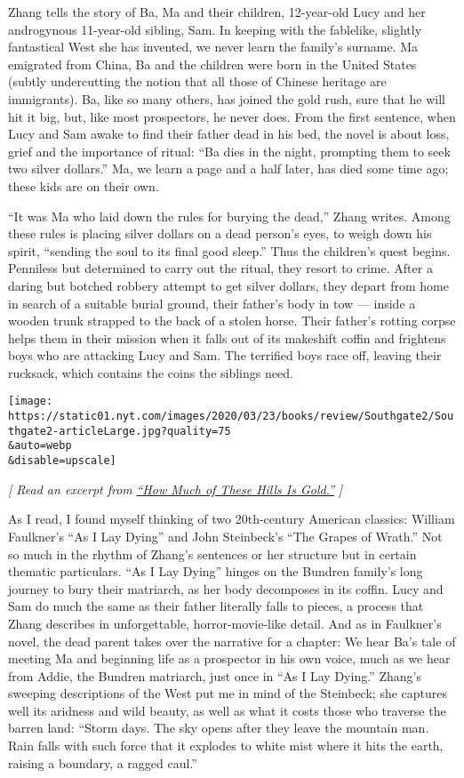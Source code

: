 Zhang tells the story of Ba, Ma and their children, 12-year-old Lucy and
her androgynous 11-year-old sibling, Sam. In keeping with the fablelike,
slightly fantastical West she has invented, we never learn the family's
surname. Ma emigrated from China, Ba and the children were born in the
United States (subtly undercutting the notion that all those of Chinese
heritage are immigrants). Ba, like so many others, has joined the gold
rush, sure that he will hit it big, but, like most prospectors, he never
does. From the first sentence, when Lucy and Sam awake to find their
father dead in his bed, the novel is about loss, grief and the
importance of ritual: ``Ba dies in the night, prompting them to seek two
silver dollars.'' Ma, we learn a page and a half later, has died some
time ago; these kids are on their own.

``It was Ma who laid down the rules for burying the dead,'' Zhang
writes. Among these rules is placing silver dollars on a dead person's
eyes, to weigh down his spirit, ``sending the soul to its final good
sleep.'' Thus the children's quest begins. Penniless but determined to
carry out the ritual, they resort to crime. After a daring but botched
robbery attempt to get silver dollars, they depart from home in search
of a suitable burial ground, their father's body in tow --- inside a
wooden trunk strapped to the back of a stolen horse. Their father's
rotting corpse helps them in their mission when it falls out of its
makeshift coffin and frightens boys who are attacking Lucy and Sam. The
terrified boys race off, leaving their rucksack, which contains the
coins the siblings need.

\texttt{[image: https://static01.nyt.com/images/2020/03/23/books/review/Southgate2/Southgate2-articleLarge.jpg?quality=75\\\&auto=webp\\\&disable=upscale]}

\emph{{[} Read an excerpt from}
\href{https://www.nytimes.com/2020/04/07/books/review/how-much-of-these-hills-is-gold-by-c-pam-zhang-an-excerpt.html}{\emph{``How
Much of These Hills Is Gold.''}} \emph{{]}}

As I read, I found myself thinking of two 20th-century American
classics: William Faulkner's ``As I Lay Dying'' and John Steinbeck's
``The Grapes of Wrath.'' Not so much in the rhythm of Zhang's sentences
or her structure but in certain thematic particulars. ``As I Lay Dying''
hinges on the Bundren family's long journey to bury their matriarch, as
her body decomposes in its coffin. Lucy and Sam do much the same as
their father literally falls to pieces, a process that Zhang describes
in unforgettable, horror-movie-like detail. And as in Faulkner's novel,
the dead parent takes over the narrative for a chapter: We hear Ba's
tale of meeting Ma and beginning life as a prospector in his own voice,
much as we hear from Addie, the Bundren matriarch, just once in ``As I
Lay Dying.'' Zhang's sweeping descriptions of the West put me in mind of
the Steinbeck; she captures well its aridness and wild beauty, as well
as what it costs those who traverse the barren land: ``Storm days. The
sky opens after they leave the mountain man. Rain falls with such force
that it explodes to white mist where it hits the earth, raising a
boundary, a ragged caul.''

